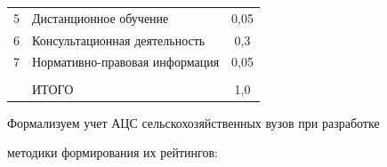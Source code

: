 \begin{table}[b]
\begin{center}
\begin{tabular}{|c|l|c|}
5&Дистанционное обучение&0,05\\


6&Консультационная деятельность&0,3\hphantom{9}\\


7&Нормативно-правовая информация&0,05\\


\hline


&&\\[-10pt]


&ИТОГО&1,0\hphantom{9}\\


\hline


\end{tabular}


\end{center}




\end{table}














  Формализуем учет АЦС сельскохозяйственных вузов при разработке 


методики формирования их рейтингов:





\noindent


